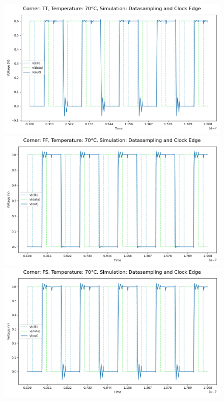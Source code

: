 \begin{figure}[H]
    \centering
    \includegraphics[height= 0.21\textheight]{figures/aimspice/TT70W1.png}
    \vspace{5pt}
    \includegraphics[height= 0.21\textheight]{figures/aimspice/FF70W1.png}
    \vspace{5pt}
    \includegraphics[height= 0.21\textheight]{figures/aimspice/FS70W1.png}

\end{figure}
